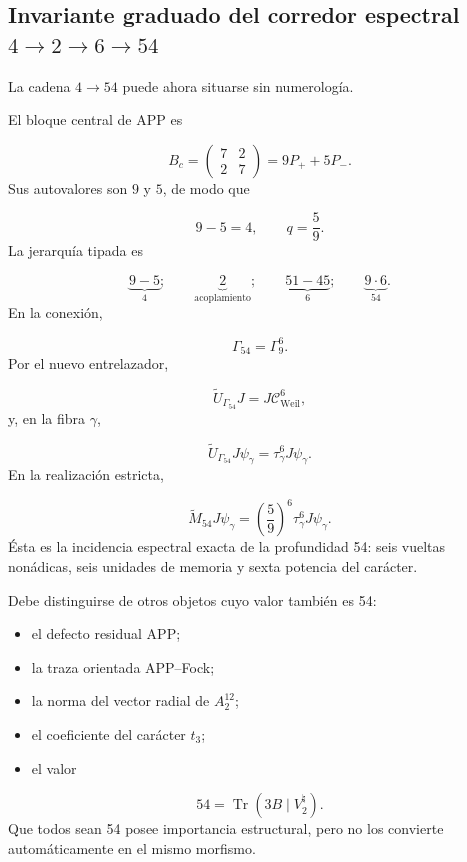 \subsection{Invariante graduado del corredor espectral \(4\to2\to6\to54\)}
La cadena \(4\to54\) puede ahora situarse sin numerología.\par
El bloque central de APP es\par
\[
B_c
=
\begin{pmatrix}
7&2\\
2&7
\end{pmatrix}
=
9P_++5P_-.
\]
Sus autovalores son \(9\) y \(5\), de modo que\par
\[
9-5=4,
\qquad
q=\frac59.
\]
La jerarquía tipada es\par
\[
\underbrace{9-5}_{4};
\qquad
\underbrace{2}_{\text{acoplamiento}};
\qquad
\underbrace{51-45}_{6};
\qquad
\underbrace{9\cdot6}_{54}.
\]
En la conexión,\par
\[
\Gamma_{54}=\Gamma_9^6.
\]
Por el nuevo entrelazador,\par
\[
\widetilde U_{\Gamma_{54}}J
=
J\mathcal C_{\mathrm{Weil}}^6,
\]
y, en la fibra \(\gamma\),\par
\[
\widetilde U_{\Gamma_{54}}J\psi_\gamma
=
\tau_\gamma^6J\psi_\gamma.
\]
En la realización estricta,\par
\[
\widetilde M_{54}J\psi_\gamma
=
\left(\frac59\right)^6
\tau_\gamma^6J\psi_\gamma.
\]
Ésta es la incidencia espectral exacta de la profundidad 54: seis vueltas nonádicas, seis unidades de memoria y sexta potencia del carácter.\par
Debe distinguirse de otros objetos cuyo valor también es 54:\par
\begin{itemize}
\item el defecto residual APP;
\item la traza orientada APP–Fock;
\item la norma del vector radial de \(A_2^{12}\);
\item el coeficiente del carácter \(t_3\);
\item el valor
\end{itemize}
  \[
  54=\operatorname{Tr}(3B\mid V^\natural_2).
  \]
Que todos sean 54 posee importancia estructural, pero no los convierte automáticamente en el mismo morfismo.\par
{}
